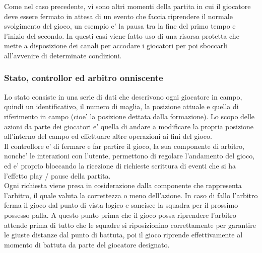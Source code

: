 Come nel caso precedente, vi sono altri momenti della partita in cui il giocatore deve essere fermato in attesa di un evento che faccia riprendere il normale svolgimento del gioco, un esempio e’ la pausa tra la fine del primo tempo e l’inizio del secondo. In questi casi viene fatto uso di una risorsa protetta che mette a disposizione dei canali per accodare i giocatori per poi sboccarli all’avvenire di determinate condizioni.

\subsubsection*{Stato, controllor ed arbitro onniscente}
%
\label{sec:analisi_concorrenza_controller_arbitro}

Lo stato consiste in una serie di dati che descrivono ogni giocatore in campo, quindi un identificativo, il numero di maglia, la posizione attuale e quella di riferimento in campo (cioe’ la posizione dettata dalla formazione). Lo scopo delle azioni da parte dei giocatori e’ quella di andare a modificare la propria posizione all’interno del campo ed effettuare altre operazioni ai fini del gioco.\\

Il controllore e’ di fermare e far partire il gioco, la sua componente di arbitro, nonche’ le interazioni con l’utente, permettono di regolare l’andamento del gioco, ed e’ proprio bloccando la ricezione di richieste scrittura di eventi che si ha l’effetto play / pause della partita.\\

Ogni richiesta viene presa in cosiderazione dalla componente che rappresenta l’arbitro, il quale valuta la correttezza o meno dell’azione. In caso di fallo l’arbitro ferma il gioco dal punto di vista logico e sancisce la squadra per il prossimo possesso palla. A questo punto prima che il gioco possa riprendere l’arbitro attende prima di tutto che le squadre si riposizionino correttamente per garantire le giuste distanze dal punto di battuta, poi il gioco riprende effettivamente al momento di battuta da parte del giocatore designato.\\

